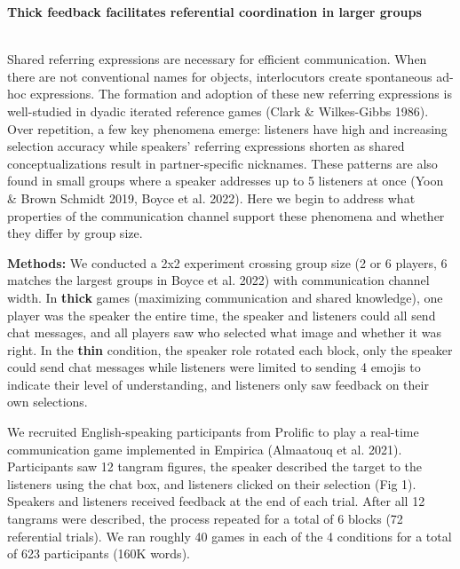 \documentclass[11pt,a4paper]{article}
\renewcommand{\title}[1]{\textbf{#1}\\}
\newcommand{\authors}[1]{\iftoggle{anonymous}{\phantom{#1}}{#1}\\}
\newcommand{\email}[1]{\iftoggle{anonymous}{\phantom{#1}}{#1}}
\begin{document}


\title{Thick feedback facilitates referential coordination in larger groups}
\authors{Veronica Boyce\textsuperscript{1}, Robert D.  Hawkins\textsuperscript{2}, Noah D. Goodman\textsuperscript{1}, Michael C. Frank\textsuperscript{1}} 
\email{vboyce@stanford.edu;  \textsuperscript{1}Stanford, \textsuperscript{2}Princeton}
\newline
%

Shared referring expressions are necessary for efficient communication. When there are not conventional names for objects, interlocutors create spontaneous ad-hoc expressions. The formation and adoption of these new referring expressions is well-studied in dyadic iterated reference games (Clark \& Wilkes-Gibbs 1986). Over repetition, a few key phenomena emerge: listeners have high and increasing selection accuracy while speakers' referring expressions shorten as shared conceptualizations result in partner-specific nicknames. These patterns are also found in small groups where a speaker addresses up to 5 listeners at once (Yoon \& Brown Schmidt 2019, Boyce et al. 2022). Here we begin to address what properties of the communication channel support these phenomena and whether they differ by group size.

\textbf{Methods:} We conducted a 2x2 experiment crossing group size (2 or 6 players, 6 matches the largest groups in Boyce et al. 2022) with communication channel width. In \textbf{thick} games (maximizing communication and shared knowledge), one  player was the speaker the entire time, the speaker and listeners could  all send chat messages, and all players saw who selected what image and whether it was right. In the \textbf{thin} condition, the speaker role rotated each block, only the speaker could send chat messages while listeners were limited to sending 4 emojis to indicate their level of understanding, and listeners only saw feedback on their own selections.


We recruited English-speaking participants from Prolific to play a real-time communication game implemented in Empirica (Almaatouq et al. 2021). Participants saw 12 tangram figures, the speaker described the target to the listeners using the chat box, and listeners clicked on their selection (Fig 1). Speakers and listeners received feedback at the end of each trial. After all 12 tangrams were described, the process repeated for a total of 6 blocks (72 referential trials). We ran roughly 40 games in each of the 4 conditions for a total of 623 participants (160K words). 
\end{document}
